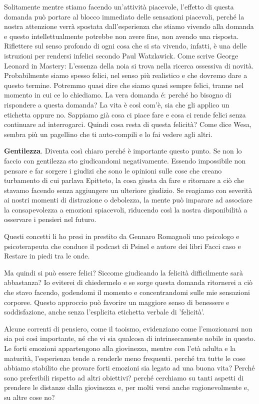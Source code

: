 \documentclass[12pt]{book} %
\begin{document}
Solitamente mentre stiamo facendo un'attività
piacevole, l'effetto di questa domanda può portare al blocco immediato delle sensazioni piacevoli, perché la
nostra attenzione verrà spostata dall'esperienza che stiamo vivendo alla domanda e questo
intellettualmente potrebbe non avere fine, non avendo una risposta. Riflettere sul senso profondo di ogni cosa che si sta
vivendo, infatti, è una delle istruzioni per rendersi infelici secondo Paul Watzlawick. Come scrive George
Leonard in Mastery: L'essenza della noia si trova nella ricerca ossessiva di novità. Probabilmente
siamo spesso felici, nel senso più realistico e che dovremo dare a questo termine. Potremmo quasi dire che siamo quasi sempre felici, tranne nel momento in cui ce lo chiediamo.
La vera domanda é: perché ho bisogno di rispondere a questa domanda? La vita è così com'è, sia che gli applico un etichetta oppure no. Sappiamo già cosa ci piace fare e cosa ci rende felici senza continuare ad interrogarci. Quindi cosa resta di questa felicità? Come dice Wesa, sembra più un pagellino che ti auto-compili e lo fai vedere agli altri. 

\textbf{Gentilezza}. Diventa così chiaro perché è importante questo punto. Se non lo faccio con gentilezza sto giudicandomi
negativamente. Essendo impossibile non pensare e far sorgere i giudizi che sono le opinioni sulle cose che creano
turbamento di cui parlava Epitteto, la cosa giusta da fare e ritornare a ciò che stavamo facendo senza aggiungere un
ulteriore giudizio. Se reagiamo con severità ai nostri momenti di distrazione o debolezza, la mente può imparare ad associare la consapevolezza a emozioni spiacevoli, riducendo così la nostra disponibilità a osservare i pensieri nel futuro.

Questi concetti li ho presi in prestito da Gennaro Romagnoli uno psicologo e psicoterapeuta che conduce il podcast
di Psinel e autore dei libri Facci caso e Restare in piedi tra le onde.

Ma quindi si può essere felici? Siccome giudicando la felicità difficilmente sarà abbastanza? Io eviterei di chiedermelo e se
sorge questa domanda ritornerei a ciò che stavo facendo, godendomi il momento e concentrandomi sulle mie sensazioni
corporee. Questo approccio può favorire un maggiore senso di benessere e soddisfazione, anche senza l'esplicita etichetta verbale di 'felicità'.

Alcune correnti di pensiero, come il taoismo, evidenziano come l'emozionarsi non sia poi così importante, né che vi sia qualcosa di intrinsecamente nobile in questo. Le forti emozioni appartengono alla giovinezza, mentre con l'età adulta e la maturità, l'esperienza tende a renderle meno frequenti. perché tra tutte le cose abbiamo stabilito che provare forti emozioni sia legato ad una buona vita? Perché sono preferibili rispetto ad altri obiettivi? perché cerchiamo su tanti aspetti di prendere le distanze dalla giovinezza e, per molti versi anche ragionevolmente e, su altre cose no?
\end{document}
